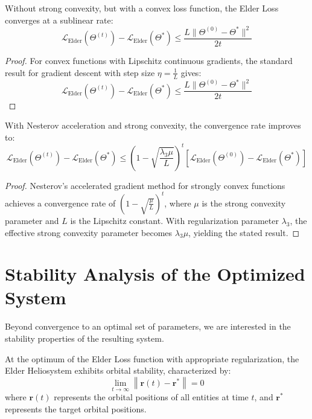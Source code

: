 \begin{theorem}
Without strong convexity, but with a convex loss function, the Elder Loss converges at a sublinear rate:
\begin{equation}
\mathcal{L}_{\text{Elder}}(\Theta^{(t)}) - \mathcal{L}_{\text{Elder}}(\Theta^*) \leq \frac{L\|\Theta^{(0)} - \Theta^*\|^2}{2t}
\end{equation}
\end{theorem}

\begin{proof}
For convex functions with Lipschitz continuous gradients, the standard result for gradient descent with step size $\eta = \frac{1}{L}$ gives:
\begin{equation}
\mathcal{L}_{\text{Elder}}(\Theta^{(t)}) - \mathcal{L}_{\text{Elder}}(\Theta^*) \leq \frac{L\|\Theta^{(0)} - \Theta^*\|^2}{2t}
\end{equation}
\end{proof}

\begin{theorem}
With Nesterov acceleration and strong convexity, the convergence rate improves to:
\begin{equation}
\mathcal{L}_{\text{Elder}}(\Theta^{(t)}) - \mathcal{L}_{\text{Elder}}(\Theta^*) \leq \left(1 - \sqrt{\frac{\lambda_3 \mu}{L}}\right)^t [\mathcal{L}_{\text{Elder}}(\Theta^{(0)}) - \mathcal{L}_{\text{Elder}}(\Theta^*)]
\end{equation}
\end{theorem}

\begin{proof}
Nesterov's accelerated gradient method for strongly convex functions achieves a convergence rate of $(1 - \sqrt{\frac{\mu}{L}})^t$, where $\mu$ is the strong convexity parameter and $L$ is the Lipschitz constant. With regularization parameter $\lambda_3$, the effective strong convexity parameter becomes $\lambda_3 \mu$, yielding the stated result.
\end{proof}

\section{Stability Analysis of the Optimized System}

Beyond convergence to an optimal set of parameters, we are interested in the stability properties of the resulting system.

\begin{theorem}
At the optimum of the Elder Loss function with appropriate regularization, the Elder Heliosystem exhibits orbital stability, characterized by:
\begin{equation}
\lim_{t \to \infty} \left\|\mathbf{r}(t) - \mathbf{r}^*\right\| = 0
\end{equation}
where $\mathbf{r}(t)$ represents the orbital positions of all entities at time $t$, and $\mathbf{r}^*$ represents the target orbital positions.
\end{theorem}

